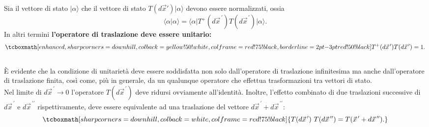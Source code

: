 Sia il vettore di stato $\vert \alpha \rangle$ che il vettore di stato $T(d\vec{x}') \vert \alpha \rangle$ devono essere normalizzati, ossia
	\begin{equation}
		\langle \alpha \vert \alpha \rangle = \langle \alpha \vert T^+(d{\vec{x}}^{\, \prime}) T(d{\vec{x}}^{\, \prime}) \vert \alpha \rangle .
	\end{equation}
In altri termini \textbf{l'operatore di traslazione deve essere unitario:}
	\begin{equation}
		\tcboxmath[enhanced,sharp corners=downhill ,colback=yellow!50!white,colframe=red!75!black, borderline={2pt}{-3pt}{red!50!black}]{
			T^+(d{\vec{x}}^{\, \prime}) T(d{\vec{x}}^{\, \prime}) =1 .
			}
	\end{equation}\\
	
È evidente che la condizione di unitarietà deve essere soddisfatta non solo dall'operatore di traslazione infinitesima ma anche dall'operatore di traslazione finita, così come, più in generale, da un qualunque operatore che effettua trasformazioni tra vettori di stato.\\

Nel limite di $d{\vec{x}}^{\, \prime} \rightarrow 0$ l'operatore $T(d{\vec{x}}^{\, \prime})$ deve ridursi ovviamente all'identità. Inoltre, l'effetto combinato di due traslazioni successive di $d{\vec{x}}^{\, \prime}$ e $d{\vec{x}}^{\, \prime \prime}$ rispettivamente, deve essere equivalente ad una traslazione del vettore $d{\vec{x}}^{\, \prime}+d{\vec{x}}^{\, \prime \prime}$: 
	\begin{equation}
		\tcboxmath[sharp corners=downhill ,colback=white,colframe=red!75!black]{
			T(d{\vec{x}}^{\, \prime})\ T(d{\vec{x}}^{\, \prime \prime}) = T({\vec{x}}^{\, \prime}+d{\vec{x}}^{\, \prime \prime}).
			}
	\end{equation}\\
	
